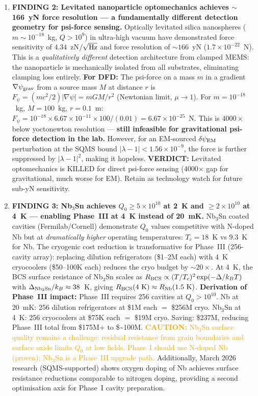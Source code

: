 \documentclass[11pt]{article}
\theoremstyle{definition}
\theoremstyle{remark}
\newcommand{\ee}[1]{\times 10^{#1}}
\newcommand{\dpsi}{\delta\psi_{\rm EM}}
\newcommand{\lam}{|\lambda-1|}
\newcommand{\caution}[1]{\textcolor{orange}{\textbf{CAUTION:} #1}}
\newcommand{\verdict}[1]{\textcolor{green!50!black}{\textbf{VERDICT:} #1}}
\begin{document}
\begin{tcolorbox}[colback=blue!5!white, colframe=blue!50!black,
  title=\textbf{W4i13 TOP 5 FINDINGS --- Ranked by Programme Impact}]
\begin{enumerate}
\item \textbf{FINDING 2: Levitated nanoparticle optomechanics achieves
$\sim$166~yN force resolution --- a fundamentally different detection
geometry for psi-force sensing.}
Optically levitated silica nanospheres ($m \sim 10^{-18}$~kg,
$Q > 10^9$) in ultra-high vacuum have demonstrated force sensitivity
of $4.34$~zN$/\sqrt{\rm Hz}$ and force resolution of
$\sim 166$~yN ($1.7\ee{-22}$~N). This is a \textit{qualitatively
different} detection architecture from clamped MEMS: the nanoparticle
is mechanically isolated from all substrates, eliminating clamping
loss entirely. \textbf{For DFD:} The psi-force on a mass $m$ in
a gradient $\nabla\psi_{\rm grav}$ from a source mass $M$ at distance
$r$ is $F_\psi = (mc^2/2)|\nabla\psi| = mGM/r^2$ (Newtonian limit,
$\mu \to 1$). For $m = 10^{-18}$~kg, $M = 100$~kg, $r = 0.1$~m:
$F_\psi = 10^{-18} \times 6.67\ee{-11} \times 100/(0.01)
= 6.67\ee{-25}$~N.
This is $4000\times$ below yoctonewton resolution --- \textbf{still
infeasible for gravitational psi-force detection in the lab.}
However, for an EM-sourced $\dpsi$ perturbation at the SQMS bound
$\lam < 1.56\ee{-9}$, the force is further suppressed by $\lam^2$,
making it hopeless.
\verdict{Levitated optomechanics is KILLED for direct psi-force
sensing (4000$\times$ gap for gravitational, much worse for EM).
Retain as technology watch for future sub-yN sensitivity.}

\item \textbf{FINDING 3: Nb$_3$Sn achieves $Q_0 \geq 5\ee{10}$ at 2~K
and $\geq 2\ee{10}$ at 4~K --- enabling Phase~III at 4~K instead
of 20~mK.}
Nb$_3$Sn coated cavities (Fermilab/Cornell) demonstrate $Q_0$ values
competitive with N-doped Nb but at \textit{dramatically higher}
operating temperatures: $T_c = 18$~K vs 9.3~K for Nb. The cryogenic
cost reduction is transformative for Phase~III (256-cavity array):
replacing dilution refrigerators (\$1--2M each) with 4~K cryocoolers
(\$50--100K each) reduces the cryo budget by $\sim 20\times$. At 4~K,
the BCS surface resistance of Nb$_3$Sn scales as
$R_{\rm BCS} \propto (T/T_c)^2 \exp(-\Delta/k_BT)$
with $\Delta_{\rm Nb_3Sn}/k_B \approx 38$~K, giving
$R_{\rm BCS}(4~{\rm K}) \approx R_{\rm Nb}(1.5~{\rm K})$.
\textbf{Derivation of Phase~III impact:}
Phase~III requires 256 cavities at $Q_0 > 10^{10}$.
Nb at 20~mK: 256 dilution refrigerators at \$1M each $=$ \$256M cryo.
Nb$_3$Sn at 4~K: 256 cryocoolers at \$75K each $=$ \$19M cryo.
Saving: \$237M, reducing Phase~III total from \$175M+ to \$\sim 100M.
\caution{Nb$_3$Sn surface quality remains a challenge: residual
resistance from grain boundaries and surface oxide limits $Q_0$ at
low fields. Phase~I should use N-doped Nb (proven); Nb$_3$Sn is a
Phase~III upgrade path.}
Additionally, March 2026 research (SQMS-supported) shows oxygen doping
of Nb achieves surface resistance reductions comparable to nitrogen
doping, providing a second optimisation axis for Phase~I cavity
preparation.


\end{enumerate}
\end{tcolorbox}
\end{document}

